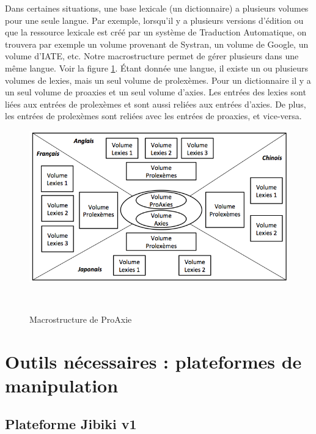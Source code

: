 \documentclass[10pt,a4paper,twoside]{article}
\begin{document}
Dans certaines situations, une base lexicale (un dictionnaire) a plusieurs volumes pour une seule langue. Par exemple, lorsqu'il y a plusieurs versions d’édition ou que la ressource lexicale est créé par un système de Traduction Automatique, on trouvera par exemple un volume provenant de Systran, un volume de Google, un volume d'IATE, etc. Notre macrostructure permet de gérer plusieurs dans une même langue. Voir la figure \ref{image-macrostructure-proaxie}. Étant donnée une langue, il existe un ou plusieurs volumes de lexies, mais un seul volume de prolexèmes. Pour un dictionnaire il y a un seul volume de proaxies et un seul volume d'axies. Les entrées des lexies sont liées aux entrées de prolexèmes et sont aussi reliées aux entrées d'axies. De plus, les entrées de prolexèmes sont reliées avec les entrées de proaxies, et vice-versa.

\begin{figure}[htbp] 
\begin{center} 
\includegraphics[width=12cm]{images/proaxie.png}
\end{center} 
\caption{Macrostructure de ProAxie} \label{image-macrostructure-proaxie} \
\end{figure}

\section{Outils nécessaires : plateformes de manipulation}

\subsection{Plateforme Jibiki v1}
\end{document}
